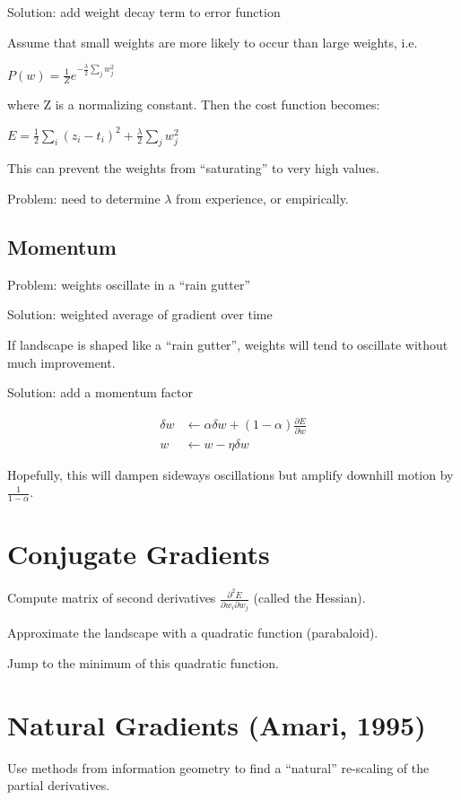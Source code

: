 Solution: add weight decay term to error function

Assume that small weights are more likely to occur than large weights, i.e.

{\centering
    $P(w) = \frac{1}{Z} e^{-\frac{\lambda}{2} \sum_j w_j^2}$

}

where Z is a normalizing constant. Then the cost function becomes:

{\centering
    $E = \frac{1}{2} \sum_i (z_i - t_i)^2 + \frac{\lambda}{2} \sum_j w_j^2$

}

This can prevent the weights from ``saturating'' to very high values.

Problem: need to determine $\lambda$ from experience, or empirically.

\subsection{Momentum}
Problem: weights oscillate in a ``rain gutter''

Solution: weighted average of gradient over time

If landscape is shaped like a ``rain gutter'', weights will tend to oscillate
without much improvement.

Solution: add a momentum factor

\begin{align*}
    \delta w &\leftarrow \alpha\delta w + (1 - \alpha)\frac{\partial E}{\partial w}\\
    w &\leftarrow w - \eta\delta w
\end{align*}

Hopefully, this will dampen sideways oscillations but amplify downhill motion
by $\frac{1}{1 - \alpha}$.

\section{Conjugate Gradients}
Compute matrix of second derivatives $\frac{\partial^2 E}{\partial w_i \partial w_j}$
(called the Hessian).

Approximate the landscape with a quadratic function (parabaloid).

Jump to the minimum of this quadratic function.

\section{Natural Gradients (Amari, 1995)}
Use methods from information geometry to find a ``natural'' re-scaling of the
partial derivatives.

